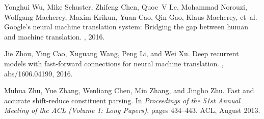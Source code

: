 \documentclass{article}
\begin{document}
\begin{thebibliography}{10}
  Yonghui Wu, Mike Schuster, Zhifeng Chen, Quoc~V Le, Mohammad Norouzi,
  Wolfgang
  Macherey, Maxim Krikun, Yuan Cao, Qin Gao, Klaus Macherey, et~al.
  \newblock Google's neural machine translation system: Bridging the gap
  between
  human and machine translation.
  , 2016.

  Jie Zhou, Ying Cao, Xuguang Wang, Peng Li, and Wei Xu.
  \newblock Deep recurrent models with fast-forward connections for neural
  machine translation.
  , abs/1606.04199, 2016.

  Muhua Zhu, Yue Zhang, Wenliang Chen, Min Zhang, and Jingbo Zhu.
  \newblock Fast and accurate shift-reduce constituent parsing.
  \newblock In {\em Proceedings of the 51st Annual Meeting of the ACL (Volume
      1:
      Long Papers)}, pages 434--443. ACL, August 2013.

\end{thebibliography}

%

%
\end{document}
